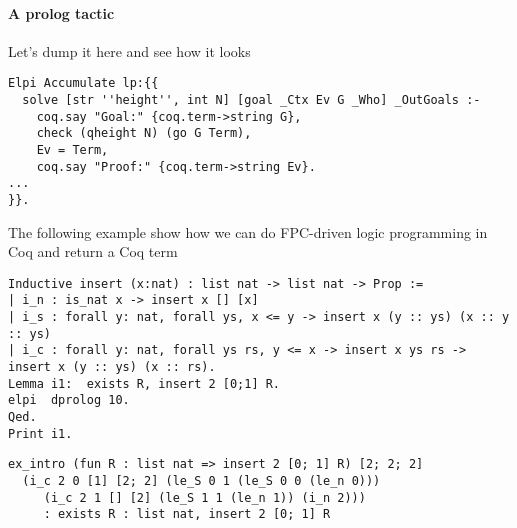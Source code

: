 \paragraph{A prolog tactic}

\begin{metanote}
  Let's dump it here and see how it looks
\end{metanote}

\begin{lstlisting}
Elpi Accumulate lp:{{
  solve [str ''height'', int N] [goal _Ctx Ev G _Who] _OutGoals :-
    coq.say "Goal:" {coq.term->string G},
    check (qheight N) (go G Term),
    Ev = Term,
    coq.say "Proof:" {coq.term->string Ev}.
...
}}.
\end{lstlisting}
The following example show how we can do FPC-driven logic programming in Coq and return
a Coq term
\begin{lstlisting}
Inductive insert (x:nat) : list nat -> list nat -> Prop :=
| i_n : is_nat x -> insert x [] [x]
| i_s : forall y: nat, forall ys, x <= y -> insert x (y :: ys) (x :: y :: ys)
| i_c : forall y: nat, forall ys rs, y <= x -> insert x ys rs -> insert x (y :: ys) (x :: rs).
Lemma i1:  exists R, insert 2 [0;1] R.
elpi  dprolog 10.
Qed.
Print i1.
\end{lstlisting}
\begin{verbatim}
ex_intro (fun R : list nat => insert 2 [0; 1] R) [2; 2; 2]
  (i_c 2 0 [1] [2; 2] (le_S 0 1 (le_S 0 0 (le_n 0)))
	 (i_c 2 1 [] [2] (le_S 1 1 (le_n 1)) (i_n 2)))
     : exists R : list nat, insert 2 [0; 1] R
\end{verbatim}
%

